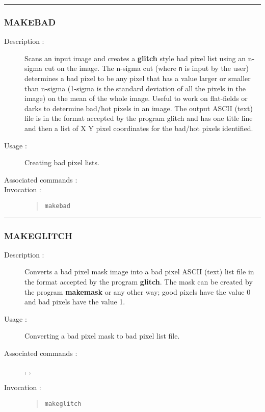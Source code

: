 \hrule 
\subsubsection*{\label{MAKEBAD}MAKEBAD}

\begin{description}

\item[Description :] Scans an input image and creates a {\bf glitch}
style bad pixel list using an n-sigma cut on the image.  The n-sigma
cut (where {\tt n} is input by the user) determines a bad pixel to be
any pixel that has a value larger or smaller than n-sigma (1-sigma is
the standard deviation of all the pixels in the image) on the mean of
the whole image.  Useful to work on flat-fields or darks to determine
bad/hot pixels in an image.  The output ASCII (text) file is in the
format accepted by the program glitch and has one title line and then a
list of X Y pixel coordinates for the bad/hot pixels identified.

\item[Usage :] Creating bad pixel lists.
\item[Associated commands :] {\tt {}}
\item[Invocation :]

\begin{quote}{\tt  makebad }\end{quote}

\end{description}

\hrule 
\subsubsection*{\label{MAKEGLITCH}MAKEGLITCH}

\begin{description}

\item[Description :] Converts a bad pixel mask image into a bad pixel
ASCII (text) list file in the format accepted by the program {\bf
glitch}.  The mask can be created by the program {\bf makemask} or any
other way; good pixels have the value 0 and bad pixels have the value
1.

\item[Usage :] Converting a bad pixel mask to bad pixel list file.

\item[Associated commands :] {\tt {}}, 
{\tt {}}, {\tt {}}

\item[Invocation :]

\begin{quote}{\tt  makeglitch }\end{quote}

\end{description}

